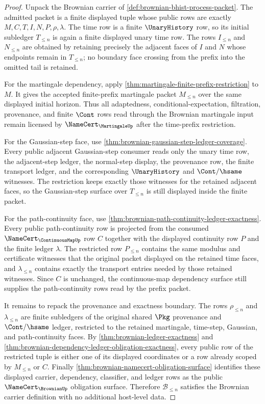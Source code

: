 \begin{proof}
Unpack the Brownian carrier of
\autoref{def:brownian-bhist-process-packet}. The admitted packet is a finite
displayed tuple whose public rows are exactly $M,C,T,I,N,P,\rho,\lambda$.
The time row is a finite $\UnaryHistory$ row, so its initial subledger
$T_{\leq n}$ is again a finite displayed unary time row. The rows
$I_{\leq n}$ and $N_{\leq n}$ are obtained by retaining precisely the adjacent
faces of $I$ and $N$ whose endpoints remain in $T_{\leq n}$; no boundary face
crossing from the prefix into the omitted tail is retained.

For the martingale dependency, apply
\autoref{thm:martingale-finite-prefix-restriction} to $M$. It gives the
accepted finite-prefix martingale packet $M_{\leq n}$ over the same displayed
initial horizon. Thus all adaptedness, conditional-expectation, filtration,
provenance, and finite $\Cont$ rows read through the Brownian martingale input
remain licensed by $\NameCert_{\MartingaleUp}$ after the time-prefix
restriction.

For the Gaussian-step face, use
\autoref{thm:brownian-gaussian-step-ledger-coverage}. Every public adjacent
Gaussian-step consumer reads only the unary time row, the adjacent-step ledger,
the normal-step display, the provenance row, the finite transport ledger, and
the corresponding $\UnaryHistory$ and $\Cont/\hsame$ witnesses. The restriction
keeps exactly those witnesses for the retained adjacent faces, so the
Gaussian-step surface over $T_{\leq n}$ is still displayed inside the finite
packet.

For the path-continuity face, use
\autoref{thm:brownian-path-continuity-ledger-exactness}. Every public
path-continuity row is projected from the consumed $\NameCert_{\ContinuousMapUp}$
row $C$ together with the displayed continuity row $P$ and the finite ledger
$\lambda$. The restricted row $P_{\leq n}$ contains the same modulus and
certificate witnesses that the original packet displayed on the retained time
faces, and $\lambda_{\leq n}$ contains exactly the transport entries needed by
those retained witnesses. Since $C$ is unchanged, the continuous-map dependency
surface still supplies the path-continuity rows read by the prefix packet.

It remains to repack the provenance and exactness boundary. The rows
$\rho_{\leq n}$ and $\lambda_{\leq n}$ are finite subledgers of the original
shared $\Pkg$ provenance and $\Cont/\hsame$ ledger, restricted to the retained
martingale, time-step, Gaussian, and path-continuity faces. By
\autoref{thm:brownian-ledger-exactness} and
\autoref{thm:brownian-dependency-ledger-obligation-exactness}, every public
row of the restricted tuple is either one of its displayed coordinates or a
row already scoped by $M_{\leq n}$ or $C$. Finally
\autoref{thm:brownian-namecert-obligation-surface} identifies these displayed
carrier, dependency, classifier, and ledger rows as the public
$\NameCert_{\BrownianUp}$ obligation surface. Therefore
$\mathcal{B}_{\leq n}$ satisfies the Brownian carrier definition with no
additional host-level data.
\end{proof}

